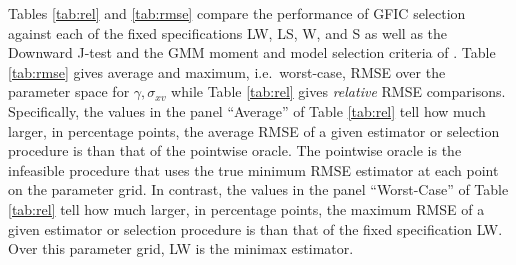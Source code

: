 
Tables \ref{tab:rel} and \ref{tab:rmse} compare the performance of GFIC selection against each of the fixed specifications LW, LS, W, and S as well as the Downward J-test and the GMM moment and model selection criteria of \cite{AndrewsLu}. 
Table \ref{tab:rmse} gives average and maximum, i.e.\ worst-case, RMSE over the parameter space for $\gamma, \sigma_{xv}$ while Table \ref{tab:rel} gives \emph{relative} RMSE comparisons. Specifically, the values in the panel ``Average'' of Table \ref{tab:rel} tell how much larger, in percentage points, the average RMSE of a given estimator or selection procedure is than that of the pointwise oracle. 
The pointwise oracle is the infeasible procedure that uses the true minimum RMSE estimator at each point on the parameter grid. 
In contrast, the values in the panel ``Worst-Case'' of Table \ref{tab:rel} tell how much larger, in percentage points, the maximum RMSE of a given estimator or selection procedure is than that of the fixed specification LW. 
Over this parameter grid, LW is the minimax estimator.


